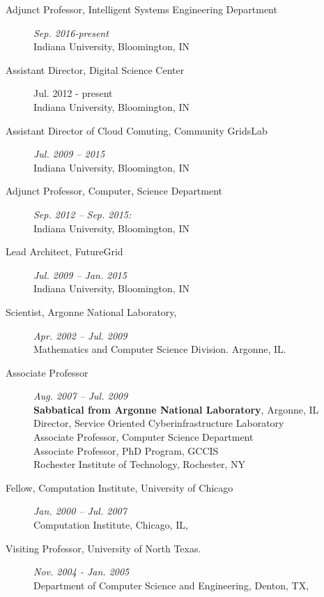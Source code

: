\documentclass{article}
\begin{document}
\begin{description}

\item[  Adjunct Professor, Intelligent Systems Engineering Department] \hfill {\it Sep. 2016-present} ~\\
  Indiana University, Bloomington, IN
  
\item[ Assistant Director, Digital Science Center]{Jul. 2012 - present} ~\\
  Indiana University, Bloomington, IN

\item[ Assistant Director of Cloud Comuting, Community GridsLab] \hfill {\it Jul. 2009 – 2015} ~\\
  Indiana University, Bloomington, IN

\item [Adjunct Professor, Computer, Science Department] \hfill {\it Sep. 2012 – Sep. 2015:} ~\\
  Indiana University, Bloomington, IN

\item[	Lead Architect, FutureGrid] \hfill {\it Jul. 2009 – Jan. 2015} ~\\
  Indiana University, Bloomington, IN

\item[ 	Scientist, Argonne National Laboratory, ] \hfill {\it Apr. 2002 – Jul. 2009} ~\\
  Mathematics and Computer Science Division.  Argonne, IL. 

\item[	Associate Professor] \hfill {\it Aug. 2007 – Jul. 2009} ~\\
  {\bf Sabbatical from Argonne National Laboratory}, Argonne, IL\\
  Director, Service Oriented Cyberinfrastructure Laboratory\\
  Associate Professor, Computer Science Department\\
  Associate Professor, PhD Program, GCCIS\\
  Rochester Institute of Technology, Rochester, NY

\item[	Fellow, Computation Institute, University of Chicago ] \hfill {\it Jan. 2000 – Jul. 2007} ~\\
  Computation Institute, Chicago, IL, 
  
\item[ 	Visiting Professor, University of North Texas. ] \hfill {\it Nov. 2004 - Jan. 2005} ~\\
  Department of Computer Science and Engineering, Denton, TX,
  

\end{description}
\end{document}
